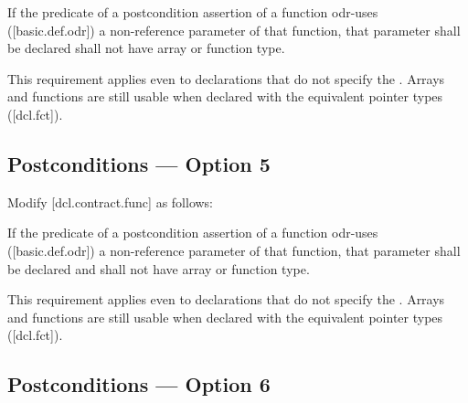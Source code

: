 \begin{adjustwidth}{0.5cm}{0.5cm}
If the predicate of a postcondition assertion of a function odr-uses ([basic.def.odr]) a
non-reference parameter of that function, that parameter shall be declared \added{, }shall not have array or function type.
\begin{note}
This requirement applies even to declarations
that do not specify the . Arrays and functions are still usable when declared with the equivalent pointer types ([dcl.fct]).
\end{note}
\begin{example}
\tcode{[...]}
\end{example}
\end{adjustwidth}

\subsection*{Postconditions --- Option 5}

Modify [dcl.contract.func] as follows:

\begin{adjustwidth}{0.5cm}{0.5cm}
If the predicate of a postcondition assertion of a function odr-uses ([basic.def.odr]) a
non-reference parameter of that function, that parameter shall be declared  and shall not have array or function type.
\begin{note}
This requirement applies even to declarations
that do not specify the . Arrays and functions are still usable when declared with the equivalent pointer types ([dcl.fct]).
\end{note}
\begin{example}
\tcode{[...]}
\end{example}
\end{adjustwidth}

\subsection*{Postconditions --- Option 6}

